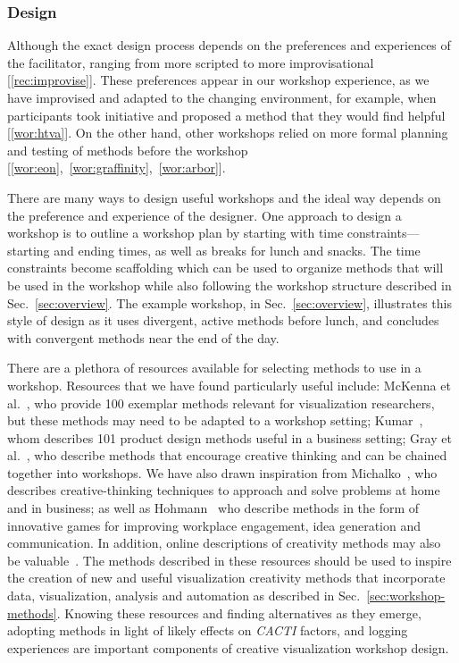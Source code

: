 \subsubsection{Design}

Although the exact design process depends on the preferences and experiences of the facilitator, ranging from more scripted to more improvisational [\ref{rec:improvise}]. These preferences appear in our workshop experience, as we have improvised and adapted to the changing environment, for example, when participants took initiative and proposed a method that they would find helpful [\ref{wor:htva}]. On the other hand, other workshops relied on more formal planning and testing of methods before the workshop [\ref{wor:eon},~\ref{wor:graffinity},~\ref{wor:arbor}].

There are many ways to design useful workshops and the ideal way depends on the preference and experience of the designer. One approach to design a workshop is to outline a workshop plan by starting with time constraints---starting and ending times, as well as breaks for lunch and snacks. The time constraints become scaffolding which can be used to organize methods that will be used in the workshop while also following the workshop structure described in Sec.~\ref{sec:overview}. The example workshop, in Sec.~\ref{sec:overview}, illustrates this style of design as it uses divergent, active methods before lunch, and concludes with convergent methods near the end of the day.

There are a plethora of resources available for selecting methods to use in a workshop. Resources that we have found particularly useful include: McKenna et al.~\cite{McKenna2014}, who provide 100 exemplar methods relevant for visualization researchers, but these methods may need to be adapted to a workshop setting; Kumar~\cite{Kumar2012}, whom describes 101 product design methods useful in a business setting; Gray et al.~\cite{Macanufo2010}, who describe methods that encourage creative thinking and can be chained together into workshops. We have also drawn inspiration from Michalko~\cite{Michalko2006}, who describes creative-thinking techniques to approach and solve problems at home and in business; as well as Hohmann~\cite{Hohmann2007} who describe methods in the form of innovative games for improving workplace engagement, idea generation and communication. In addition, online descriptions of creativity methods may also be valuable~\cite{MyCotedInc2018,Maiden2018CreativeEngine}. The methods described in these resources should be used to inspire the creation of new and useful visualization creativity methods that incorporate data, visualization, analysis and automation as described in Sec.~\ref{sec:workshop-methods}. Knowing these resources and finding alternatives as they emerge, adopting methods in light of likely effects on \emph{CACTI} factors, and logging experiences are important components of creative visualization workshop design.

